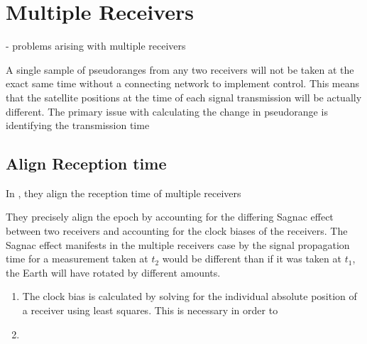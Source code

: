 

\section{Multiple Receivers}
- problems arising with multiple receivers

A single sample of pseudoranges from any two receivers will not be taken at the exact same time without a connecting network to implement control. This means that the satellite positions at the time of each signal transmission will be actually different. The primary issue with calculating the change in pseudorange is identifying the transmission time 


\subsection{Align Reception time}
In \cite{HighAccDiffTrack}, they align the reception time of multiple receivers

They precisely align the epoch by accounting for the differing Sagnac effect between two receivers and accounting for the clock biases of the receivers. The Sagnac effect manifests in the multiple receivers case by the signal propagation time for a measurement taken at $t_2$ would be different than if it was taken at $t_1$, the Earth will have rotated by different amounts. 
\begin{enumerate}
\item The clock bias is calculated by solving for the individual absolute position of a receiver using least squares. This is necessary in order to 
\item  
\end{enumerate}